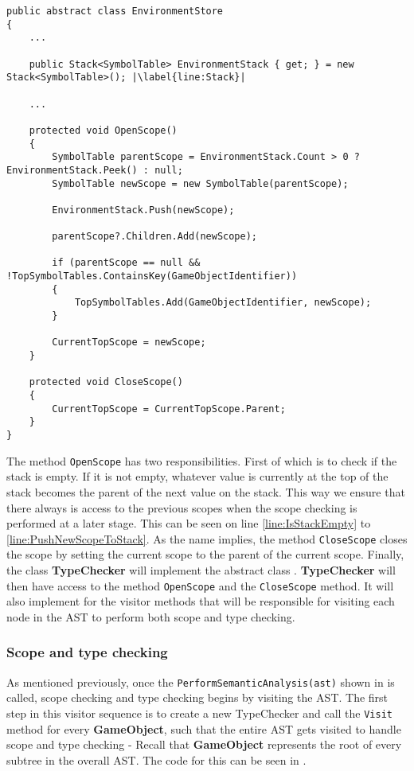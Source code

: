 \begin{lstlisting}[language=CSharp, caption={Abstract class SemanticAnalysis}, label={lst:ACSemanticAnalysis},escapechar=|]
public abstract class EnvironmentStore
{
    ...

    public Stack<SymbolTable> EnvironmentStack { get; } = new Stack<SymbolTable>(); |\label{line:Stack}|

    ...

    protected void OpenScope()
    {
        SymbolTable parentScope = EnvironmentStack.Count > 0 ? EnvironmentStack.Peek() : null;
        SymbolTable newScope = new SymbolTable(parentScope);
        
        EnvironmentStack.Push(newScope);

        parentScope?.Children.Add(newScope);

        if (parentScope == null && !TopSymbolTables.ContainsKey(GameObjectIdentifier))
        {
            TopSymbolTables.Add(GameObjectIdentifier, newScope);
        }
        
        CurrentTopScope = newScope;
    }

    protected void CloseScope()
    {
        CurrentTopScope = CurrentTopScope.Parent;
    }
}
\end{lstlisting}

The method \texttt{OpenScope} has two responsibilities. First of which is to check if the stack is empty. If it is not empty, whatever value is currently at the top of the stack becomes the parent of the next value on the stack. This way we ensure that there always is access to the previous scopes when the scope checking is performed at a later stage. This can be seen on line \ref{line:IsStackEmpty} to \ref{line:PushNewScopeToStack}.
As the name implies, the method \texttt{CloseScope} closes the scope by setting the current scope to the parent of the current scope.
Finally, the class \textbf{TypeChecker} will implement the abstract class \abstractsemanticclass{}. \textbf{TypeChecker} will then have access to the method \texttt{OpenScope} and the \texttt{CloseScope} method. It will also implement  for the visitor methods that will be responsible for visiting each node in the AST to perform both scope and type checking.

\subsubsection*{Scope and type checking} \label{sec:TypeChecker}
As mentioned previously, once the \texttt{PerformSemanticAnalysis(ast)} shown in  is called, scope checking and type checking begins by visiting the AST. The first step in this visitor sequence is to create a new TypeChecker and call the \texttt{Visit} method for every \textbf{GameObject}, such that the entire AST gets visited to handle scope and type checking - Recall that \textbf{GameObject} represents the root of every subtree in the overall AST. The code for this can be seen in .

